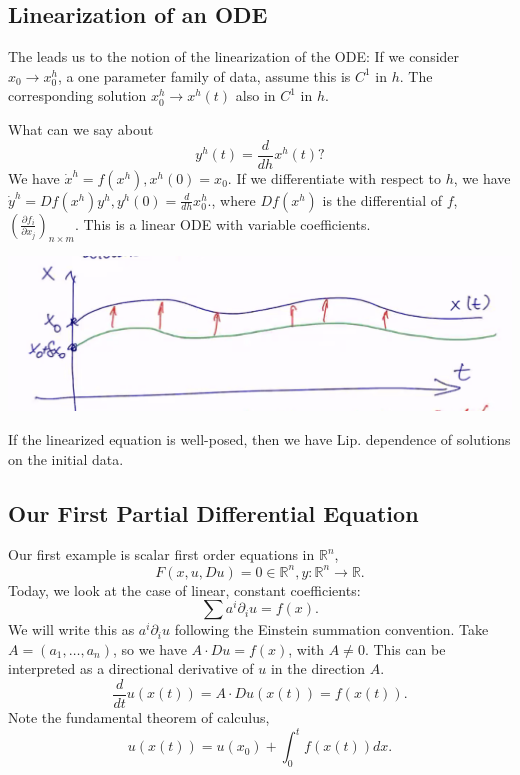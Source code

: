 \documentclass[12pt]{scrartcl}
\newcommand{\R}{\mathbb{R}}
\begin{document}
\subsection{Linearization of an ODE}
The leads us to the notion of the linearization of the ODE: If we consider $x_0 \rightarrow x_0^h$, a one parameter family of data, assume this is $C^1$ in $h$.  The corresponding solution $x_0^h \rightarrow x^h(t)$ also in $C^1$ in $h$.  

What can we say about $$y^h(t) = \frac{d}{dh}x^h(t)?$$  We have $\dot{x}^h = f(x^h), x^h(0) = x_0.$  If we differentiate with respect to $h$, we have $\dot{y}^h = Df(x^h)y^h, y^h(0) = \frac{d}{dh}x_0^h.$, 
where $Df(x^h)$ is the differential of $f$, $\left (\frac{\partial f_i}{\partial x_j}\right )_{n\times m}$.   This is a linear ODE with variable coefficients.
\begin{center}
\includegraphics[scale=0.5]{linear.png}
\end{center}
\begin{proposition} If the linearized equation is well-posed, then we have Lip. dependence of solutions on the initial data.
\end{proposition}
\subsection{Our First Partial Differential Equation}
Our first example is scalar first order equations in $\R^n$, $$F(x, u, Du) = 0 \in \R^n, y:\R^n \rightarrow \R.$$
Today, we look at the case of linear, constant coefficients:
$$\sum a^i \partial_i u = f(x).$$
We will write this as $a^i \partial_i u$ following the Einstein summation convention.
Take $A = (a_1, \dots, a_n)$, so we have $A \cdot Du = f(x)$, with $A \ne 0$.  This can be interpreted as a directional derivative of $u$ in the direction $A$.
$$\frac{d}{dt}u(x(t)) = A \cdot Du(x(t)) = f(x(t)).$$
Note the fundamental theorem of calculus,
$$u(x(t)) = u(x_0) +\int_0^t f(x(t))dx.$$
\end{document}
